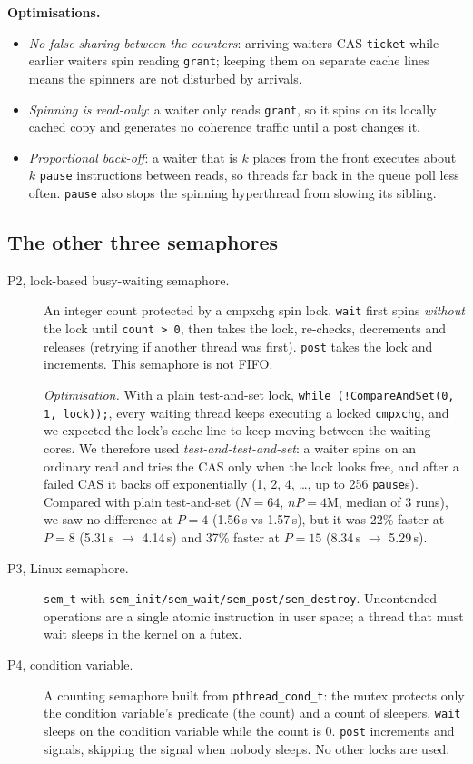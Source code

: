\documentclass[10pt,a4paper]{article}
\begin{document}
\textbf{Optimisations.}
\begin{itemize}
\item \emph{No false sharing between the counters}: arriving waiters CAS \texttt{ticket} while earlier waiters spin reading \texttt{grant};
      keeping them on separate cache lines means the spinners are not disturbed by arrivals.
\item \emph{Spinning is read-only}: a waiter only reads \texttt{grant}, so it spins on its locally cached copy and generates no coherence traffic until a post changes it.
\item \emph{Proportional back-off}: a waiter that is $k$ places from the front executes about $k$ \texttt{pause} instructions between reads,
      so threads far back in the queue poll less often. \texttt{pause} also stops the spinning hyperthread from slowing its sibling.
\end{itemize}

\subsection{The other three semaphores}
\begin{description}
\item[P2, lock-based busy-waiting semaphore.] An integer count protected by a cmpxchg spin lock.
  \texttt{wait} first spins \emph{without} the lock until \texttt{count > 0}, then takes the lock, re-checks, decrements and releases (retrying if another thread was first).
  \texttt{post} takes the lock and increments. This semaphore is not FIFO.

  \emph{Optimisation.} With a plain test-and-set lock, \texttt{while (!CompareAndSet(0, 1, lock));}, every waiting thread keeps executing a locked
  \texttt{cmpxchg}, and we expected the lock's cache line to keep moving between the waiting cores. We therefore used \emph{test-and-test-and-set}:
  a waiter spins on an ordinary read and tries the CAS only when the lock looks free, and after a failed CAS it backs off exponentially
  (1, 2, 4, \ldots, up to 256 \texttt{pause}s). Compared with plain test-and-set ($N=64$, $nP=4$M, median of 3 runs), we saw no difference at $P=4$
  (1.56\,s vs 1.57\,s), but it was 22\% faster at $P=8$ (5.31\,s $\to$ 4.14\,s) and 37\% faster at $P=15$ (8.34\,s $\to$ 5.29\,s).
\item[P3, Linux semaphore.] \texttt{sem\_t} with \texttt{sem\_init/sem\_wait/sem\_post/sem\_destroy}. Uncontended operations are a single atomic instruction in user space;
  a thread that must wait sleeps in the kernel on a futex.
\item[P4, condition variable.] A counting semaphore built from \texttt{pthread\_cond\_t}: the mutex protects only the condition variable's predicate (the count)
  and a count of sleepers. \texttt{wait} sleeps on the condition variable while the count is 0. \texttt{post} increments and signals, skipping the signal when nobody sleeps.
  No other locks are used.
\end{description}
\end{document}
